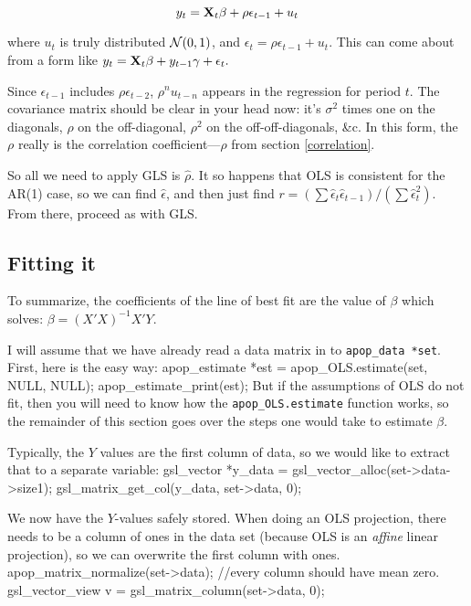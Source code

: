 $$y_t={\bf X}_t\beta + \rho\epsilon_{t-1} + u_t$$

where $u_t$ is truly distributed ${\cal N}(0,1)$, and $\epsilon_t=
\rho\epsilon_{t-1} + u_t$. This can come about from  a form like
$y_t={\bf X}_t\beta + y_{t-1}\gamma + \epsilon_t.$


Since $\epsilon_{t-1}$ includes $\rho\epsilon_{t-2}$, $\rho^n u_{t-n}$
appears in the regression for period $t$. The covariance matrix should
be clear in your head now: it's $\sigma^2$ times one on the diagonals,
$\rho$ on the off-diagonal, $\rho^2$ on the off-off-diagonals, \&c. In
this form, the $\rho$ really is the correlation coefficient---$\rho$
from section \ref{correlation}.

So all we need to apply GLS is $\hat\rho$. It so happens that OLS is
consistent for the AR(1) case, so we can find $\hat\epsilon$, and then
just find $r=(\sum \hat\epsilon_t \hat\epsilon_{t-1})/(\sum
\hat\epsilon_t^2)$. From there, proceed as with GLS.



\subsection{Fitting it} 
To summarize,
the coefficients of  the line of best fit are the value of $\beta$ which solves:
$ \beta = (X'X)^{-1}X'Y$.

I will assume that we have already read a data matrix in to {\tt apop\_data *set}. First, here is the easy way:
apop_estimate *est = apop_OLS.estimate(set, NULL, NULL);
apop_estimate_print(est);
But if the assumptions of OLS do not fit, then you will need to know how
the {\tt apop\_\-OLS.est\-i\-mate} function works, so the remainder of this
section goes over the steps one would take to estimate $\beta$.  

 Typically, the $Y$
values are the first column of data, so we would like to extract that to a separate variable:
gsl_vector      *y_data         = gsl_vector_alloc(set->data->size1);
gsl_matrix_get_col(y_data, set->data, 0);


We now have the $Y$-values safely stored.  When doing an OLS projection,
there needs to be a column of ones in the data set (because OLS is an
{\sl affine} linear projection), so we can overwrite the first column
with ones. 
        apop_matrix_normalize(set->data);            //every column should have mean zero.
gsl_vector_view v         = gsl_matrix_column(set->data, 0);


